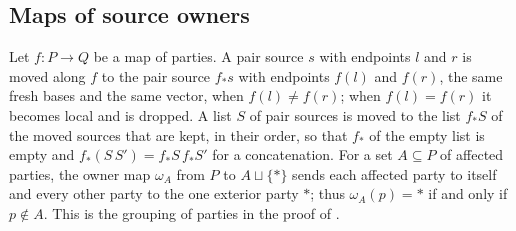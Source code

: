 \subsection{Maps of source owners}
\label{sec:party_owner_map}

\begin{definition}
    \label{def:party_owner_map}
    \leanok
    Let $f\colon P\to Q$ be a map of parties. A pair source $s$ with endpoints $l$
    and $r$ is moved along $f$ to the pair source $f_*s$ with endpoints $f(l)$ and
    $f(r)$, the same fresh bases and the same vector, when $f(l)\neq f(r)$; when
    $f(l)=f(r)$ it becomes local and is dropped. A list $S$ of pair sources is moved
    to the list $f_*S$ of the moved sources that are kept, in their order, so that
    $f_*$ of the empty list is empty and $f_*(S\,S')=f_*S\,f_*S'$ for a concatenation.
    For a set $A\subseteq P$ of affected parties, the owner map $\omega_A$ from $P$
    to $A\sqcup\{\ast\}$ sends each affected party to itself and every other party to
    the one exterior party $\ast$; thus $\omega_A(p)=\ast$ if and only if
    $p\notin A$. This is the grouping of parties in the proof of
    \cite[Theorem~5.2]{OpenAI2026PolynomialPEPS}.
\end{definition}

